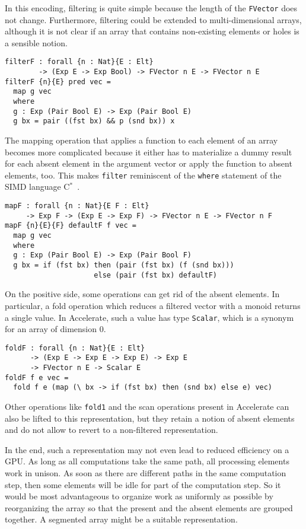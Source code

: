 \documentclass{llncs}
\begin{document}
In this encoding, filtering is quite simple because the length of
the \texttt{FVector} does not change. Furthermore, filtering could be
extended to multi-dimensional arrays, although it is not clear if an
array that contains non-existing elements or holes is a sensible notion.
\begin{verbatim}
filterF : forall {n : Nat}{E : Elt}
        -> (Exp E -> Exp Bool) -> FVector n E -> FVector n E
filterF {n}{E} pred vec =
  map g vec
  where
  g : Exp (Pair Bool E) -> Exp (Pair Bool E)
  g bx = pair ((fst bx) && p (snd bx)) x
\end{verbatim}
The mapping operation that applies a function to each element of an
array becomes more complicated because it either has to 
materialize a dummy result for each absent element in the argument
vector or apply the function to absent elements, too. This makes \texttt{filter} reminiscent of the \texttt{where} statement of the SIMD language C$^*$~\cite{rose-etal:c-star}.
\begin{verbatim}
mapF : forall {n : Nat}{E F : Elt}
     -> Exp F -> (Exp E -> Exp F) -> FVector n E -> FVector n F
mapF {n}{E}{F} defaultF f vec =
  map g vec
  where
  g : Exp (Pair Bool E) -> Exp (Pair Bool F)
  g bx = if (fst bx) then (pair (fst bx) (f (snd bx)))
                     else (pair (fst bx) defaultF)
\end{verbatim}
On the positive side, some operations can get rid of the absent
elements. In particular, a fold operation which reduces a filtered
vector with a monoid returns a single value. In Accelerate, such a value has type
\texttt{Scalar}, which is a synonym for an array of dimension $0$.
\begin{verbatim}
foldF : forall {n : Nat}{E : Elt}
      -> (Exp E -> Exp E -> Exp E) -> Exp E
      -> FVector n E -> Scalar E
foldF f e vec =
  fold f e (map (\ bx -> if (fst bx) then (snd bx) else e) vec)
\end{verbatim}
Other operations like \texttt{fold1} and the scan operations present
in Accelerate can also be lifted to this representation, but they
retain a notion of absent elements and do not allow to revert to a
non-filtered representation. 

In the end, such a representation may not even lead to reduced efficiency on a GPU. As long
as all computations take the same path, all processing elements work
in unison. As soon as there are different paths in the same
computation step, then some elements will be idle for part of the
computation step. So it would be most advantageous to organize work as
uniformly as possible by reorganizing the array so that the present
and the absent elements are grouped together. A segmented array might
be a suitable representation.
\end{document}
